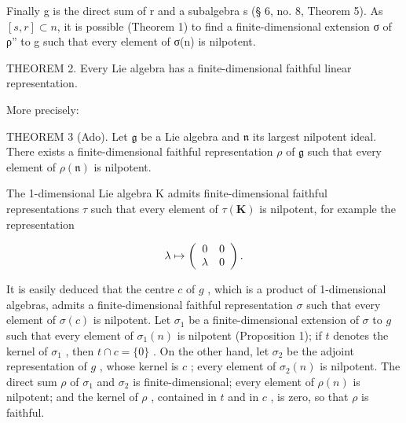 Finally g is the direct sum of r and a subalgebra s (§ 6, no. 8, Theorem 5). As \([s, r] \subset n\), it is possible (Theorem 1) to find a finite-dimensional extension σ of ρ'' to g such that every element of σ(n) is nilpotent.

THEOREM 2. Every Lie algebra has a finite-dimensional faithful linear representation.

More precisely:

THEOREM 3 (Ado). Let \(\mathfrak{g}\) be a Lie algebra and \(\mathfrak{n}\) its largest nilpotent ideal. There exists a finite-dimensional faithful representation \(\rho\) of \(\mathfrak{g}\) such that every element of \(\rho(\mathfrak{n})\) is nilpotent.

The 1-dimensional Lie algebra K admits finite-dimensional faithful representations \(\tau\) such that every element of \(\tau(\mathbf{K})\) is nilpotent, for example the representation

\[
\lambda \mapsto \left( \begin{array}{c c} 0 & 0 \\ \lambda & 0 \end{array} \right).
\]

It is easily deduced that the centre \(c\) of \(g\) , which is a product of 1-dimensional algebras, admits a finite-dimensional faithful representation \(\sigma\) such that every element of \(\sigma(c)\) is nilpotent. Let \(\sigma_1\) be a finite-dimensional extension of \(\sigma\) to \(g\) such that every element of \(\sigma_1(n)\) is nilpotent (Proposition 1); if \(t\) denotes the kernel of \(\sigma_1\) , then \(t \cap c = \{0\}\) . On the other hand, let \(\sigma_2\) be the adjoint representation of \(g\) , whose kernel is \(c\) ; every element of \(\sigma_2(n)\) is nilpotent. The direct sum \(\rho\) of \(\sigma_1\) and \(\sigma_2\) is finite-dimensional; every element of \(\rho(n)\) is nilpotent; and the kernel of \(\rho\) , contained in \(t\) and in \(c\) , is zero, so that \(\rho\) is faithful.



